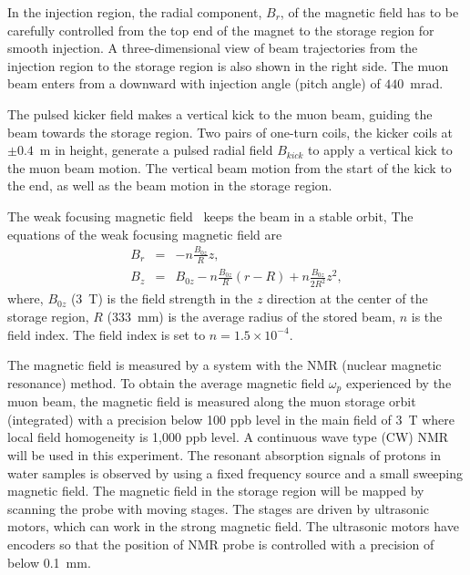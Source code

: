 In the injection region, the radial component, $B_{r}$, of the magnetic field has to be carefully controlled from the top end of the magnet to the storage region for smooth injection. 
A three-dimensional view of beam trajectories from the injection region to the storage region is also shown in the right side. 
The muon beam enters from a downward with injection angle (pitch angle) of $440$~mrad. 

The pulsed kicker field makes a vertical kick to the muon beam, guiding the beam towards the storage region.
Two pairs of one-turn coils, the kicker coils at $\pm0.4$~m in height, 
generate a pulsed radial field $B_{kick}$ to apply a vertical kick to the muon beam motion. 
The vertical beam motion from the start of the kick to the end, as well as the beam motion in the storage region.

The weak focusing magnetic field~\cite{Iinuma:2016zfu} keeps the beam in a stable orbit,
The equations of the weak focusing magnetic field are 
\begin{eqnarray}
 B_r &=& -n\frac{B_{0z}}{R}z, \\
 B_z &=& B_{0z}-n\frac{B_{0z}}{R}(r-R)+ n\frac{B_{0z}}{2R^2}z^2,  
\label{eq:weak}
\end{eqnarray}
where, $B_{0z}$ (3~T) is the field strength in the $z$ direction at the center of the storage region,
$R$ (333~mm) is the average radius of the stored beam, $n$ is the field index.
The field index is set to $n=1.5\times 10^{-4}$.

The magnetic field is measured by a system with the NMR (nuclear magnetic resonance) method.
To obtain the average magnetic field $\omega_{p}$ experienced by the muon beam,
the magnetic field is measured along the muon storage orbit (integrated) with a precision below 100 ppb level
in the main field of 3~T where local field homogeneity is 1,000 ppb level.
A continuous wave type (CW) NMR will be used in this experiment. 
The resonant absorption signals of protons in water samples is observed
by using a fixed frequency source and a small sweeping magnetic field.
The magnetic field in the storage region will be mapped by scanning the probe with moving stages.
The stages are driven by ultrasonic motors, which can work in the strong magnetic field.
The ultrasonic motors have encoders so that the position of NMR probe is controlled
with a precision of below 0.1~mm.


